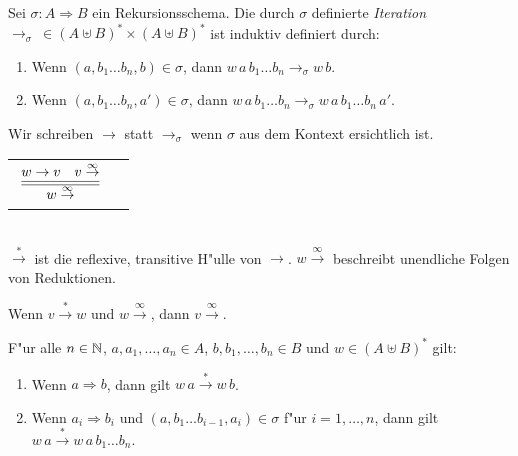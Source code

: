 \documentclass[12pt,a4paper]{article}
\begin{document}
\begin{definition}[Iteration]
  Sei $\sigma: A \Rightarrow B$ ein Rekursionsschema. Die durch $\sigma$ definierte \emph{Iteration}
  $\to_\sigma\ \in (A \uplus B)^* \times (A \uplus B)^*$ ist induktiv definiert durch:
  \begin{enumerate}
  \item Wenn $(a,b_1 \ldots b_n,b) \in \sigma$,
    dann $w\,a\,b_1 \ldots b_n \to_\sigma w\,b$.
  \item Wenn $(a,b_1 \ldots b_n,a') \in \sigma$,
    dann $w\,a\,b_1 \ldots b_n \to_\sigma w\,a\,b_1 \ldots b_n\,a'$.
  \end{enumerate}
\end{definition}
Wir schreiben $\to$ statt $\to_\sigma$ wenn $\sigma$ aus dem Kontext ersichtlich ist.
\\[5mm]
\begin{tabular}{ll}
  $\Rule{w \to v \quad v \stackrel{\infty}{\to}}{w \stackrel{\infty}{\to}}$ 
\end{tabular} \\[5mm]
$\stackrel{*}{\to}$ ist die reflexive, transitive H"ulle von $\to$. $w \stackrel{\infty}{\to}$
beschreibt unendliche Folgen von Reduktionen.

\begin{lemma} \label{lemma:Redex_Star_und_Infty}
  Wenn $v \stackrel{*}{\rightarrow} w$ und $w \stackrel{\infty}{\rightarrow}$,
  dann $v \stackrel{\infty}{\rightarrow}$.
\end{lemma}

\begin{theorem} \label{theorem:Vollstaendigkeit}
  F"ur alle $n \in \mathbb N$, $a,a_1,\ldots,a_n \in A$, $b,b_1,\ldots,b_n \in B$ und $w \in (A \uplus B)^*$ gilt:
  \begin{enumerate}
  \item Wenn $a \Rightarrow b$, dann gilt $w\,a \stackrel{*}{\to} w\,b$.
  \item Wenn $a_i \Rightarrow b_i$ und $(a,b_1 \ldots b_{i-1},a_i) \in \sigma$ f"ur $i=1,\ldots,n$, dann gilt
    $w\,a \stackrel{*}{\to} w\,a\,b_1 \ldots b_n$.
  \end{enumerate}
\end{theorem}
\end{document}

